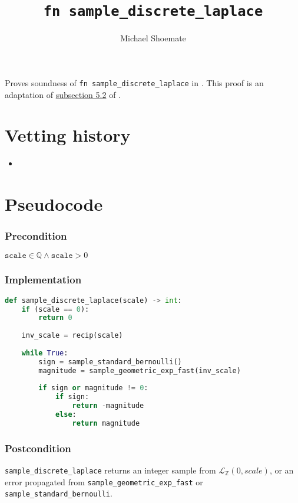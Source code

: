 \documentclass{article}
\title{\texttt{fn sample\_discrete\_laplace}}
\author{Michael Shoemate}
\begin{document}
\maketitle

\contrib
Proves soundness of \texttt{fn sample\_discrete\_laplace} in .
This proof is an adaptation of \href{https://arxiv.org/pdf/2004.00010.pdf#subsection.5.2}{subsection 5.2} of \cite{CKS20}.

\section{Vetting history}
\begin{itemize}
    \item {}
\end{itemize}

\section{Pseudocode}
\subsubsection*{Precondition}
$\texttt{scale} \in \mathbb{Q} \land \texttt{scale} > 0$

\subsubsection*{Implementation}        
\begin{lstlisting}[language=Python]
def sample_discrete_laplace(scale) -> int:
    if (scale == 0):
        return 0
        
    inv_scale = recip(scale)
    
    while True:
        sign = sample_standard_bernoulli()
        magnitude = sample_geometric_exp_fast(inv_scale)
        
        if sign or magnitude != 0:
            if sign:
                return -magnitude
            else:
                return magnitude
\end{lstlisting}

\subsubsection*{Postcondition}
\texttt{sample\_discrete\_laplace} returns an integer sample from $\mathcal{L}_\mathbb{Z}(0, scale)$, or an error propagated from \texttt{sample\_geometric\_exp\_fast} or \texttt{sample\_standard\_bernoulli}.
\end{document}
